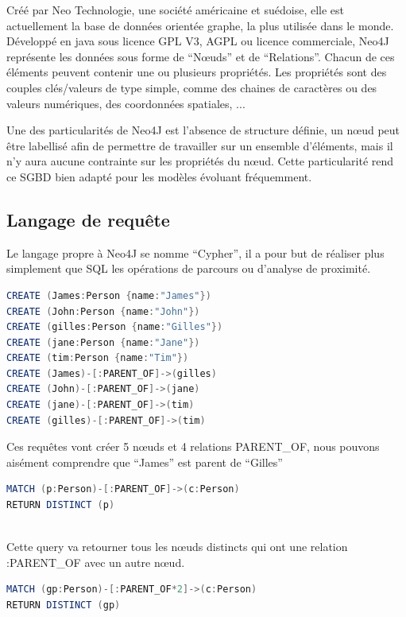 \documentclass[a4paper,fleqn,12pt]{report}
\begin{document}
Créé par Neo Technologie, une société américaine et suédoise, elle est actuellement la base de données orientée graphe, la plus utilisée dans le monde\cite{DBEnginesSite}. Développé en java sous licence GPL V3, AGPL ou licence commerciale, Neo4J représente les données sous forme de \enquote{Nœuds} et de \enquote{Relations}. Chacun de ces éléments peuvent contenir une ou plusieurs propriétés. Les propriétés sont des couples clés/valeurs de type simple, comme des chaines de caractères ou des valeurs numériques, des coordonnées spatiales, ... \cite{Neo4JSite}

Une des particularités de Neo4J est l’absence de structure définie, un nœud peut être labellisé afin de permettre de travailler sur un ensemble d’éléments, mais il n’y aura aucune contrainte sur les propriétés du nœud. Cette particularité rend ce SGBD bien adapté pour les modèles évoluant fréquemment.


\subsection{Langage de requête}

Le langage propre à Neo4J se nomme \enquote{Cypher}\label{Cypher}, il a pour but de réaliser plus simplement que SQL les opérations de parcours ou d'analyse de proximité.

\begin{lstlisting}[language=java, frame=single]
CREATE (James:Person {name:"James"})
CREATE (John:Person {name:"John"})
CREATE (gilles:Person {name:"Gilles"})
CREATE (jane:Person {name:"Jane"})
CREATE (tim:Person {name:"Tim"})
CREATE (James)-[:PARENT_OF]->(gilles)
CREATE (John)-[:PARENT_OF]->(jane)
CREATE (jane)-[:PARENT_OF]->(tim)
CREATE (gilles)-[:PARENT_OF]->(tim)
\end{lstlisting}

Ces requêtes vont créer 5 nœuds et 4 relations PARENT\_OF, nous pouvons aisément comprendre que \enquote{James} est parent de \enquote{Gilles}

\begin{lstlisting}[language=java, frame=single]
MATCH (p:Person)-[:PARENT_OF]->(c:Person) 
RETURN DISTINCT (p)
	
\end{lstlisting}

Cette query va retourner tous les nœuds distincts qui ont une relation :PARENT\_OF avec un autre nœud.

\begin{lstlisting}[language=java, frame=single]
MATCH (gp:Person)-[:PARENT_OF*2]->(c:Person) 
RETURN DISTINCT (gp)
	
\end{lstlisting}
\end{document}
